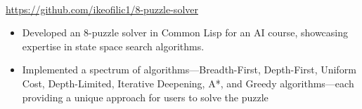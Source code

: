 \\
{\url{https://github.com/ikeofilic1/8-puzzle-solver}}
\begin{itemize}
    \item Developed an 8-puzzle solver in Common Lisp for an AI course, showcasing expertise in state space search algorithms.
    \item Implemented a spectrum of algorithms—Breadth-First, Depth-First, Uniform Cost, Depth-Limited, Iterative Deepening, A*, and Greedy algorithms—each providing a unique approach for users to solve the puzzle
\end{itemize}
